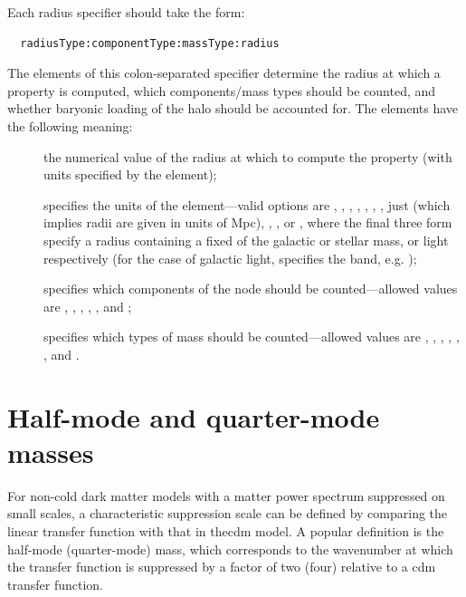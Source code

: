 Each radius specifier should take the form:
\begin{verbatim}
  radiusType:componentType:massType:radius
\end{verbatim}
The elements of this colon-separated specifier determine the radius at which a property is computed, which components/mass types should be counted, and whether baryonic loading of the halo should be accounted for. The elements have the following meaning:
\begin{description}
 \item [] the numerical value of the radius at which to compute the property (with units specified by the  element);
 \item [] specifies the units of the  element---valid options are , , , , , , , just  (which implies radii are given in units of Mpc), , , or \newline {}, where the final three form specify a radius containing a fixed  of the galactic or stellar mass, or light respectively (for the case of galactic light,  specifies the band, e.g. );
 \item [] specifies which components of the node should be counted---allowed values are , , , , , and ;
 \item [] specifies which types of mass should be counted---allowed values are , , , , , , and .
\end{description}

\section{Half-mode and quarter-mode masses}
For non-cold dark matter models with a matter power spectrum suppressed on small scales, a characteristic suppression scale can be defined by comparing the linear transfer function with that in the\gls{cdm} model. A popular definition is the half-mode (quarter-mode) mass, which corresponds to the wavenumber at which the transfer function is suppressed by a factor of two (four) relative to a \gls{cdm} transfer function.

